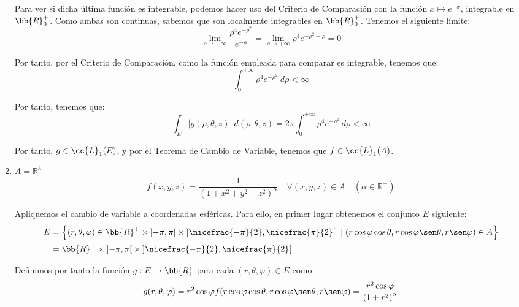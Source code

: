 \begin{ejercicio}
\begin{enumerate}
        Para ver si dicha última función es integrable, podemos hacer uso del Criterio de Comparación con la función $x\mapsto e^{-x}$, integrable en $\bb{R}^+_0$.
        Como ambas son continuas, sabemos que son localmente integrables en $\bb{R}^+_0$. Tenemos el siguiente límite:
        \begin{equation*}
            \lim_{\rho\to+\infty} \frac{\rho^4e^{-\rho^2}}{e^{-\rho}} = \lim_{\rho\to+\infty} \rho^4e^{-\rho^2+\rho} = 0
        \end{equation*}

        Por tanto, por el Criterio de Comparación, como la función empleada para comparar es integrable, tenemos que:
        \begin{equation*}
            \int_0^{+\infty}\rho^4e^{-\rho^2}~d\rho < \infty
        \end{equation*}

        Por tanto, tenemos que:
        \begin{equation*}
            \int_E |g(\rho, \theta, z)|~d(\rho, \theta, z) = 2\pi \int_0^{+\infty}\rho^4e^{-\rho^2}~d\rho < \infty
        \end{equation*}

        Por tanto, $g\in \cc{L}_1(E)$, y por el Teorema de Cambio de Variable, tenemos que $f\in \cc{L}_1(A)$.

        \item \( A = \mathbb{R}^3 \)
        \[ f(x, y, z) = \frac{1}{\left(1 + x^2 + y^2 + z^2\right)^\alpha} \quad \forall (x, y, z) \in A \quad (\alpha \in \mathbb{R}^+) \]

        Apliquemos el cambio de variable a coordenadas esféricas. Para ello, en primer
        lugar obtenemos el conjunto $E$ siguiente:
        \begin{align*}
            E &= \left\{ (r, \theta, \varphi) \in \bb{R}^+\times \left]-\pi, \pi\right[ \times \left] \nicefrac{-\pi}{2},\nicefrac{\pi}{2} \right[ ~\mid (r\cos\varphi\cos\theta, r\cos\varphi\sen\theta, r\sen\varphi) \in A \right\} \\
            &= \bb{R}^+\times \left]-\pi, \pi\right[ \times \left] \nicefrac{-\pi}{2},\nicefrac{\pi}{2} \right[
        \end{align*}

        Definimos por tanto la función $g: E \to \bb{R}$ para cada $(r, \theta, \varphi) \in E$ como:
        \begin{equation*}
            g(r, \theta, \varphi) = r^2\cos\varphi f(r\cos\varphi\cos\theta, r\cos\varphi\sen\theta, r\sen\varphi) =
            \frac{r^2\cos\varphi}{\left(1 + r^2\right)^\alpha}
        \end{equation*}


\end{enumerate}
\end{ejercicio}
